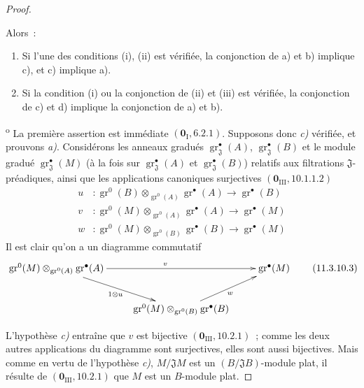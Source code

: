 \begin{proof}
\begin{lemma}[11.3.10.2]
Alors~:
\begin{enumerate}[label=\textup{\arabic{enumi}\textsuperscript{o}}]
\item Si l'une des conditions \textup{(i), (ii)} est vérifiée, la conjonction de \textup{a)} et
\textup{b)} implique \textup{c)}, et \textup{c)} implique \textup{a)}.


\item Si la condition \textup{(i)} ou la conjonction de \textup{(ii)} et \textup{(iii)} est vérifiée, la
conjonction de \textup{c)} et \textup{d)} implique la conjonction de \textup{a)} et \textup{b)}.
\end{enumerate}
\end{lemma}

\textsuperscript{o} La première assertion est immédiate
$(\mathbf 0_{\mathrm I},6.2.1)$. Supposons donc \emph{c)} vérifiée, et prouvons \emph{a)}.
Considérons les anneaux gradués $\operatorname{gr}_{\mathfrak J}^\bullet(A)$,
$\operatorname{gr}_{\mathfrak J}^\bullet(B)$ et le module gradué
$\operatorname{gr}_{\mathfrak J}^\bullet(M)$ (à la fois sur
$\operatorname{gr}_{\mathfrak J}^\bullet(A)$ et
$\operatorname{gr}_{\mathfrak J}^\bullet(B)$) relatifs aux filtrations
$\mathfrak J$-préadiques, ainsi que les applications canoniques surjectives
$(\mathbf 0_{\mathrm{III}},10.1.1.2)$
\begin{align*}
u&:\operatorname{gr}^0(B)\otimes_{\operatorname{gr}^0(A)}
   \operatorname{gr}^\bullet(A)\longrightarrow\operatorname{gr}^\bullet(B)\\
v&:\operatorname{gr}^0(M)\otimes_{\operatorname{gr}^0(A)}
   \operatorname{gr}^\bullet(A)\longrightarrow\operatorname{gr}^\bullet(M)\\
w&:\operatorname{gr}^0(M)\otimes_{\operatorname{gr}^0(B)}
   \operatorname{gr}^\bullet(B)\longrightarrow\operatorname{gr}^\bullet(M)
\end{align*}
Il est clair qu'on a un diagramme commutatif
\begin{equation}
\xymatrix{
\operatorname{gr}^0(M)\otimes_{\operatorname{gr}^0(A)}\operatorname{gr}^\bullet(A)
 \ar[rr]^v \ar[dr]_{1\otimes u} && \operatorname{gr}^\bullet(M) \\
& \operatorname{gr}^0(M)\otimes_{\operatorname{gr}^0(B)}
  \operatorname{gr}^\bullet(B) \ar[ur]_w &
}
\label{IV.11.3.10.3-fr}
\tag{11.3.10.3}
\end{equation}

L'hypothèse \emph{c)} entraîne que $v$ est bijective
$(\mathbf 0_{\mathrm{III}},10.2.1)$~; comme les deux autres applications du
diagramme sont surjectives, elles sont aussi bijectives. Mais comme en vertu de
l'hypothèse \emph{c)}, $M/\mathfrak JM$ est un $(B/\mathfrak JB)$-module plat, il
résulte de $(\mathbf 0_{\mathrm{III}},10.2.1)$ que $M$ est un $B$-module plat.


\end{proof}

